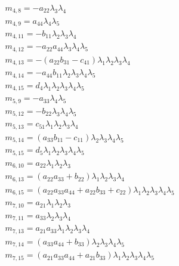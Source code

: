 \documentclass{article}
\begin{document}
\begin{align*}
&m_{4,8}=-a_{22} \lambda_{3} \lambda_{4}\\
&m_{4,9}=a_{44} \lambda_{4} \lambda_{5}\\
&m_{4,11}=-b_{11} \lambda_{2} \lambda_{3} \lambda_{4}\\
&m_{4,12}=-a_{22} a_{44} \lambda_{3} \lambda_{4} \lambda_{5}\\
&m_{4,13}=-{\left(a_{22} b_{31} - c_{41}\right)} \lambda_{1} \lambda_{2} \lambda_{3} \lambda_{4}\\
&m_{4,14}=-a_{44} b_{11} \lambda_{2} \lambda_{3} \lambda_{4} \lambda_{5}\\
&m_{4,15}=d_{4} \lambda_{1} \lambda_{2} \lambda_{3} \lambda_{4} \lambda_{5}\\
&m_{5,9}=-a_{33} \lambda_{4} \lambda_{5}\\
&m_{5,12}=-b_{22} \lambda_{3} \lambda_{4} \lambda_{5}\\
&m_{5,13}=c_{51} \lambda_{1} \lambda_{2} \lambda_{3} \lambda_{4}\\
&m_{5,14}={\left(a_{33} b_{11} - c_{11}\right)} \lambda_{2} \lambda_{3} \lambda_{4} \lambda_{5}\\
&m_{5,15}=d_{5} \lambda_{1} \lambda_{2} \lambda_{3} \lambda_{4} \lambda_{5}\\
&m_{6,10}=a_{22} \lambda_{1} \lambda_{2} \lambda_{3}\\
&m_{6,13}={\left(a_{22} a_{33} + b_{22}\right)} \lambda_{1} \lambda_{2} \lambda_{3} \lambda_{4}\\
&m_{6,15}={\left(a_{22} a_{33} a_{44} + a_{22} b_{33} + c_{22}\right)} \lambda_{1} \lambda_{2} \lambda_{3} \lambda_{4} \lambda_{5}\\
&m_{7,10}=a_{21} \lambda_{1} \lambda_{2} \lambda_{3}\\
&m_{7,11}=a_{33} \lambda_{2} \lambda_{3} \lambda_{4}\\
&m_{7,13}=a_{21} a_{33} \lambda_{1} \lambda_{2} \lambda_{3} \lambda_{4}\\
&m_{7,14}={\left(a_{33} a_{44} + b_{33}\right)} \lambda_{2} \lambda_{3} \lambda_{4} \lambda_{5}\\
&m_{7,15}={\left(a_{21} a_{33} a_{44} + a_{21} b_{33}\right)} \lambda_{1} \lambda_{2} \lambda_{3} \lambda_{4} \lambda_{5}\\
\end{align*}
\end{document}

